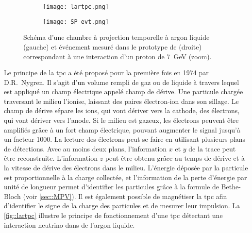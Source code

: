     \begin{figure}[htbp]
      \begin{subfigure}[t]{0.57\textwidth}
        \flushleft
        \centering
        \texttt{[image: lartpc.png]}
      \end{subfigure}
      \begin{subfigure}[t]{0.43\textwidth}
        \flushleft
        \centering
        \texttt{[image: SP\_evt.png]}
      \end{subfigure}
      \caption[Schéma d'une chambre à projection temporelle à argon liquide et exemple d'événement vue par \protosp{}.]{\label{fig::lartpc}Schéma d'une chambre à projection temporelle à argon liquide (gauche) et événement mesuré dans le prototype de \protosp{} (droite) correspondant à une interaction d'un proton de \SI{7}{\giga\eV} (zoom).}
    \end{figure}
    Le principe de la \acrfull{tpc} a été proposé pour la première fois en 1974 par D.R.~Nygren\cite{Nygren1974}. Il s'agit d'un volume rempli de gaz ou de liquide à travers lequel est appliqué un champ électrique appelé champ de dérive. Une particule chargée traversant le milieu l'ionise, laissant des paires électron-ion dans son sillage. Le champ de dérive sépare les ions, qui vont dériver vers la cathode, des électrons, qui vont dériver vers l'anode. Si le milieu est gazeux, les électrons peuvent être amplifiés grâce à un fort champ électrique, pouvant augmenter le signal jusqu'à un facteur 1000. La lecture des électrons peut se faire en utilisant plusieurs plans de détections. Avec au moins deux plans, l'information $x$ et $y$ de la trace peut être reconstruite. L'information $z$ peut être obtenu grâce au temps de dérive et à la vitesse de dérive des électrons dans le milieu. L'énergie déposée par la particule est proportionnelle à la charge collectée, et l'information de la perte d'énergie par unité de longueur permet d'identifier les particules grâce à la formule de Bethe-Bloch (voir \autoref{sec::MPV}). Il est également possible de magnétiser la \gls{tpc} afin d'identifier le signe de la charge des particules et de mesurer leur impulsion. La \autoref{fig::lartpc} illustre le principe de fonctionnement d'une \gls{tpc} détectant une interaction neutrino dans de l'argon liquide.

